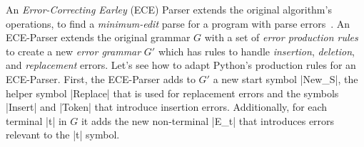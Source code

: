 %

%
An \emph{Error-Correcting Earley} (ECE) Parser
extends the original algorithm's operations,
to find a \emph{minimum-edit} parse for a program
with parse errors~\citep{Aho_1972}.
%
An ECE-Parser extends the original grammar $G$
with a set of \emph{error production rules} to
create a new \emph{error grammar} $G'$ which has
rules to handle \emph{insertion}, \emph{deletion},
and \emph{replacement} errors.
%
Let's see how to adapt Python's production rules for an ECE-Parser.
%
First, the ECE-Parser adds to $G'$ a new start symbol |New_S|, the helper
symbol |Replace| that is used for replacement errors and the symbols |Insert|
and |Token| that introduce insertion errors. Additionally, for each terminal |t|
in $G$ it adds the new non-terminal |E_t| that introduces errors relevant to the
|t| symbol.

